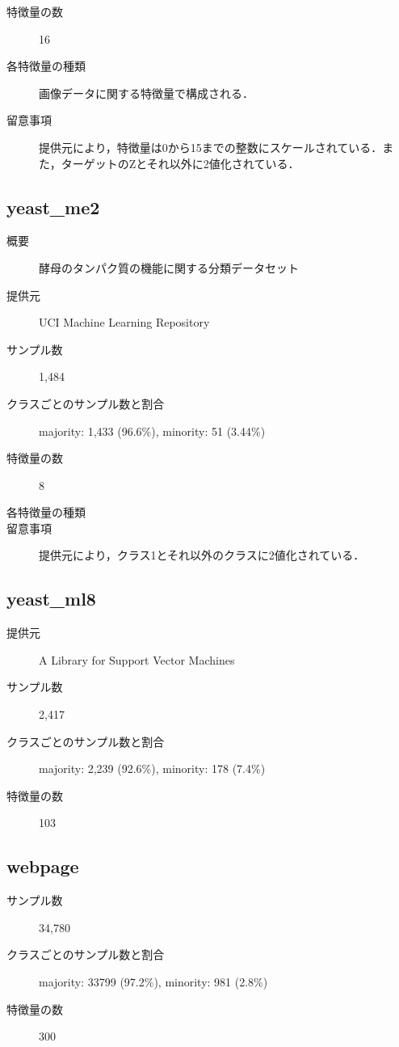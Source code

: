 \begin{description}
    \item[特徴量の数] 16
    \item[各特徴量の種類] 画像データに関する特徴量で構成される．
        
    \item[留意事項] 提供元により，特徴量は0から15までの整数にスケールされている．また，ターゲットのZとそれ以外に2値化されている．
\end{description}


\subsection{yeast\_me2}
\begin{description}
    \item[概要] 酵母のタンパク質の機能に関する分類データセット\cite{yeast}
    \item[提供元] UCI Machine Learning Repository
    \item[サンプル数] 1,484
    \item[クラスごとのサンプル数と割合] majority: 1,433 (96.6\%), minority: 51 (3.44\%)

    \item[特徴量の数] 8
    \item[各特徴量の種類] \mbox{}
        
    \item[留意事項] 提供元により，クラス1とそれ以外のクラスに2値化されている．
\end{description}

\subsection{yeast\_ml8}
\begin{description}
    \item[提供元] A Library for Support Vector Machines
    \item[サンプル数] 2,417
    \item[クラスごとのサンプル数と割合] majority: 2,239 (92.6\%), minority: 178 (7.4\%)

    \item[特徴量の数] 103
\end{description}


\subsection{webpage}
\begin{description}
    \item[サンプル数] 34,780
    \item[クラスごとのサンプル数と割合] majority: 33799 (97.2\%), minority: 981 (2.8\%)

    \item[特徴量の数] 300
\end{description}


